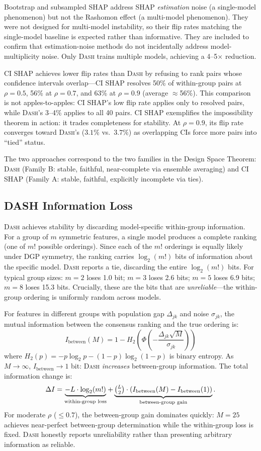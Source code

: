 \documentclass{jmlr}
\newcommand{\DASH}{\textsc{Dash}}
\begin{document}
Bootstrap and subsampled SHAP address SHAP \emph{estimation} noise (a single-model phenomenon) but not the Rashomon effect (a multi-model phenomenon). They were not designed for multi-model instability, so their flip rates matching the single-model baseline is expected rather than informative. They are included to confirm that estimation-noise methods do not incidentally address model-multiplicity noise. Only \DASH{} trains multiple models, achieving a 4--5$\times$ reduction.

CI SHAP achieves lower flip rates than \DASH{} by refusing to rank pairs whose confidence intervals overlap---CI SHAP resolves 50\% of within-group pairs at $\rho=0.5$, 56\% at $\rho=0.7$, and 63\% at $\rho=0.9$ (average $\approx$56\%). This comparison is not apples-to-apples: CI SHAP's low flip rate applies only to resolved pairs, while \DASH{}'s 3--4\% applies to all 40 pairs. CI SHAP exemplifies the impossibility theorem in action: it trades completeness for stability. At $\rho = 0.9$, its flip rate converges toward \DASH{}'s ($3.1\%$ vs.\ $3.7\%$) as overlapping CIs force more pairs into ``tied'' status.

The two approaches correspond to the two families in the Design Space Theorem: \DASH{} (Family B: stable, faithful, near-complete via ensemble averaging) and CI SHAP (Family A: stable, faithful, explicitly incomplete via ties).

\subsection{DASH Information Loss}
\label{sec:info-loss}

\DASH{} achieves stability by discarding model-specific within-group information. For a group of $m$ symmetric features, a single model produces a complete ranking (one of $m!$ possible orderings). Since each of the $m!$ orderings is equally likely under DGP symmetry, the ranking carries $\log_2(m!)$ bits of information about the specific model. \DASH{} reports a tie, discarding the entire $\log_2(m!)$ bits. For typical group sizes: $m=2$ loses 1.0 bit; $m=3$ loses 2.6 bits; $m=5$ loses 6.9 bits; $m=8$ loses 15.3 bits. Crucially, these are the bits that are \emph{unreliable}---the within-group ordering is uniformly random across models.

For features in different groups with population gap $\Delta_{jk}$ and noise $\sigma_{jk}$, the mutual information between the consensus ranking and the true ordering is:
\[
    I_{\text{between}}(M) = 1 - H_2\!\left(\Phi\!\left(-\frac{\Delta_{jk}\sqrt{M}}{\sigma_{jk}}\right)\right)
\]
where $H_2(p) = -p\log_2 p - (1-p)\log_2(1-p)$ is binary entropy. As $M \to \infty$, $I_{\text{between}} \to 1$ bit: \DASH{} \emph{increases} between-group information. The total information change is:
\[
    \Delta I = \underbrace{-L \cdot \log_2(m!)}_{\text{within-group loss}} + \underbrace{\tbinom{L}{2} \cdot (I_{\text{between}}(M) - I_{\text{between}}(1))}_{\text{between-group gain}}.
\]
For moderate $\rho$ ($\leq 0.7$), the between-group gain dominates quickly: $M = 25$ achieves near-perfect between-group determination while the within-group loss is fixed. \DASH{} honestly reports unreliability rather than presenting arbitrary information as reliable.
\end{document}

